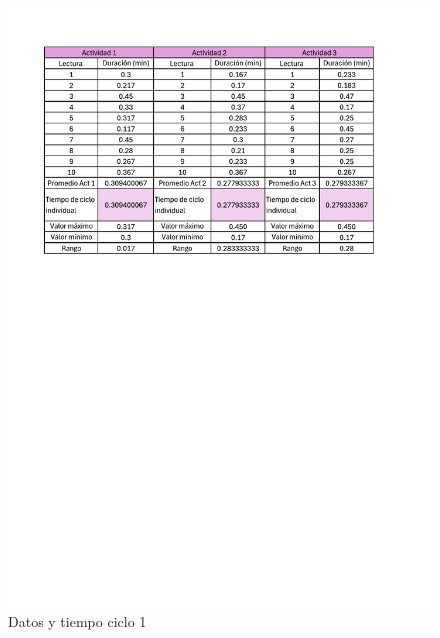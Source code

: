      \begin{figure}[H]
        \centering
        \includegraphics[trim = {15mm 160mm 20mm 
        5mm},clip,scale=0.4]{16/Img/muestreo1}
        \caption{Datos y tiempo ciclo 1}
        \label{fig:Datos y tiempo ciclo 1}
    \end{figure}
    
